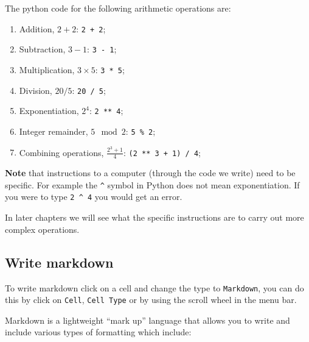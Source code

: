 The python code for the following arithmetic operations are:

\begin{enumerate}

\item 

Addition, \(2 + 2\): \texttt{2 + 2};

\item 

Subtraction, \(3 - 1\): \texttt{3 - 1};

\item 

Multiplication, \(3 \times 5\): \texttt{3 * 5};

\item 

Division, \(20 / 5\): \texttt{20 / 5};

\item 

Exponentiation, \(2 ^ 4\): \texttt{2 ** 4};

\item 

Integer remainder, \(5 \mod 2\): \texttt{5 \% 2};

\item 

Combining operations, \(\frac{2 ^ 3 + 1}{4}\): \texttt{(2 ** 3 + 1) / 4};

\end{enumerate}


\textbf{Note} that instructions to a computer (through the code we write) need
to be specific. For example the \texttt{\textasciicircum{}} symbol in Python
does not mean exponentiation. If you were to type \texttt{2 \textasciicircum{} 4} you would get an error.

In later chapters we will see what the specific instructions are to carry out more complex operations.

\subsection{Write markdown}

To write markdown click on a cell and change the type to \texttt{Markdown}, you can do
this by click on \texttt{Cell}, \texttt{Cell Type} or by using the scroll wheel in the menu
bar.


Markdown is a lightweight ``mark up'' language that allows you to write and
include various types of formatting which include:

